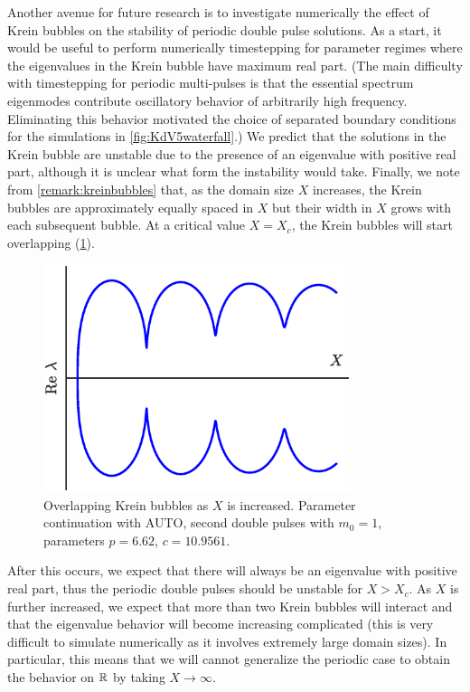 \documentclass[10pt,reqno]{amsart}
\theoremstyle{plain}
\theoremstyle{definition}
\theoremstyle{remark}
\numberwithin{theorem}{section}
\numberwithin{equation}{section}
\begin{document}
Another avenue for future research is to investigate numerically the effect of Krein bubbles on the stability of periodic double pulse solutions. As a start, it would be useful to perform numerically timestepping for parameter regimes where the eigenvalues in the Krein bubble have maximum real part. (The main difficulty with timestepping for periodic multi-pulses is that the essential spectrum eigenmodes contribute oscillatory behavior of arbitrarily high frequency. Eliminating this behavior motivated the choice of separated boundary conditions for the simulations in \cref{fig:KdV5waterfall}.) We predict that the solutions in the Krein bubble are unstable due to the presence of an eigenvalue with positive real part, although it is unclear what form the instability would take. Finally, we note from \cref{remark:kreinbubbles} that, as the domain size $X$ increases, the Krein bubbles are approximately equally spaced in $X$ but their width in $X$ grows with each subsequent bubble. At a critical value $X = X_c$, the Krein bubbles will start overlapping (\cref{fig:KreinBubbleCollision}).
\begin{figure}[H]
\begin{center}
\includegraphics[width=9cm]{images/KreinBubbleCollision.eps}
\end{center}
\caption{Overlapping Krein bubbles as $X$ is increased. Parameter continuation with AUTO, second double pulses with $m_0 = 1$, parameters $p = 6.62$, $c = 10.9561$.}
\label{fig:KreinBubbleCollision}
\end{figure}
\noi After this occurs, we expect that there will always be an eigenvalue with positive real part, thus the periodic double pulses should be unstable for $X > X_c$. As $X$ is further increased, we expect that more than two Krein bubbles will interact and that the eigenvalue behavior will become increasing complicated (this is very difficult to simulate numerically as it involves extremely large domain sizes). In particular, this means that we will cannot generalize the periodic case to obtain the behavior on $\mathbb{R}$ by taking $X\rightarrow \infty$.



\end{document}
